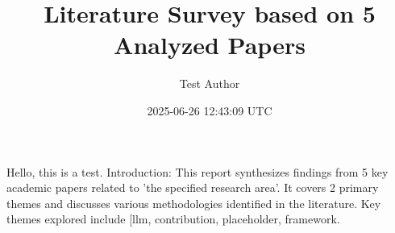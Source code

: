 \documentclass{article}
\title{Literature Survey based on 5 Analyzed Papers}
\author{Test Author}
\date{2025-06-26 12:43:09 UTC}
\begin{document}
\maketitle
Hello, this is a test.
Introduction: This report synthesizes findings from 5 key academic papers related to 'the specified research area'. It covers 2 primary themes and discusses various methodologies identified in the literature. Key themes explored include [llm, contribution, placeholder, framework.
\end{document}
